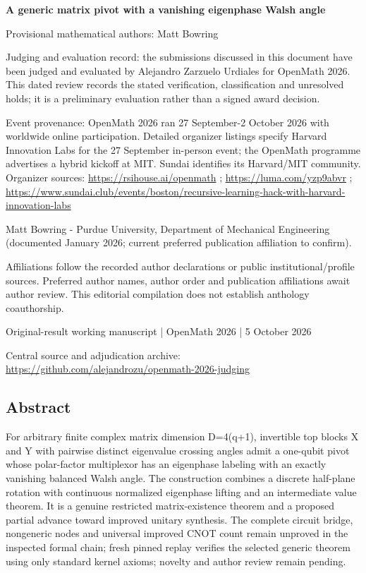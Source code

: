 \documentclass[11pt,a4paper]{article}
\begin{document}
{\LARGE\bfseries A generic matrix pivot with a vanishing eigenphase Walsh angle\par}\medskip
{\small Provisional mathematical authors: Matt Bowring\par}\medskip
{\small Judging and evaluation record: the submissions discussed in this document have been judged and evaluated by Alejandro Zarzuelo Urdiales for OpenMath 2026. This dated review records the stated verification, classification and unresolved holds; it is a preliminary evaluation rather than a signed award decision.\par}

{\small Event provenance: OpenMath 2026 ran 27 September-2 October 2026 with worldwide online participation. Detailed organizer listings specify Harvard Innovation Labs for the 27 September in-person event; the OpenMath programme advertises a hybrid kickoff at MIT. Sundai identifies its Harvard/MIT community. Organizer sources: \url{https://rsihouse.ai/openmath} ; \url{https://luma.com/yzp9abvr} ; \url{https://www.sundai.club/events/boston/recursive-learning-hack-with-harvard-innovation-labs}\par}

{\small Matt Bowring  -  Purdue University, Department of Mechanical Engineering (documented January 2026; current preferred publication affiliation to confirm).\par}

{\small Affiliations follow the recorded author declarations or public institutional/profile sources. Preferred author names, author order and publication affiliations await author review. This editorial compilation does not establish anthology coauthorship.\par}

{\small Original-result working manuscript | OpenMath 2026 | 5 October 2026\par}\medskip
{\small Central source and adjudication archive: \url{https://github.com/alejandrozu/openmath-2026-judging}\par}

\subsection{Abstract}
For arbitrary finite complex matrix dimension D=4(q+1), invertible top blocks X and Y with pairwise distinct eigenvalue crossing angles admit a one-qubit pivot whose polar-factor multiplexor has an eigenphase labeling with an exactly vanishing balanced Walsh angle. The construction combines a discrete half-plane rotation with continuous normalized eigenphase lifting and an intermediate value theorem. It is a genuine restricted matrix-existence theorem and a proposed partial advance toward improved unitary synthesis. The complete circuit bridge, nongeneric nodes and universal improved CNOT count remain unproved in the inspected formal chain; fresh pinned replay verifies the selected generic theorem using only standard kernel axioms; novelty and author review remain pending.
\end{document}
